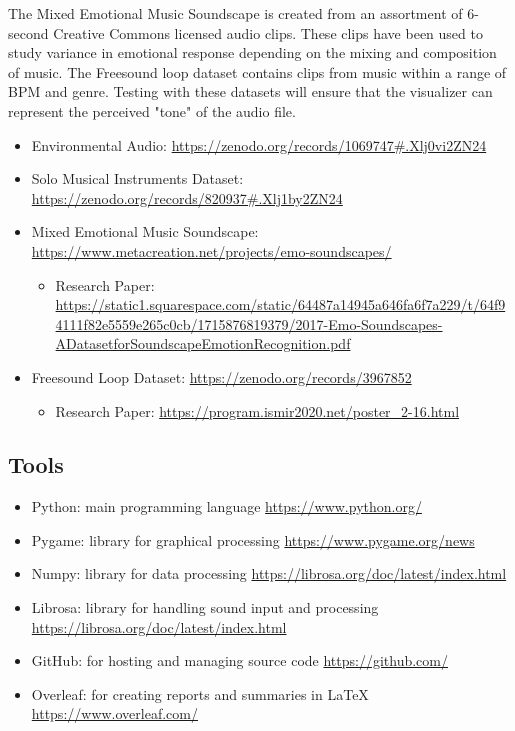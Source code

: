\documentclass{article}
\begin{document}
The Mixed Emotional Music Soundscape is created from an assortment of 6-second Creative Commons licensed audio clips. These clips have been used to study variance in emotional response depending on the mixing and composition of music. The Freesound loop dataset contains clips from music within a range of BPM and genre. Testing with these datasets will ensure that the visualizer can represent the perceived "tone" of the audio file. \newline

\begin{itemize}
    \item Environmental Audio: \url{https://zenodo.org/records/1069747#.Xlj0vi2ZN24}
    \item Solo Musical Instruments Dataset: \url{https://zenodo.org/records/820937#.Xlj1by2ZN24}
    \item Mixed Emotional Music Soundscape: \url{https://www.metacreation.net/projects/emo-soundscapes/}
    \begin{itemize}
        \item Research Paper: \url{https://static1.squarespace.com/static/64487a14945a646fa6f7a229/t/64f94111f82e5559e265c0cb/1715876819379/2017-Emo-Soundscapes-ADatasetforSoundscapeEmotionRecognition.pdf}
    \end{itemize}
    \item Freesound Loop Dataset: \url{https://zenodo.org/records/3967852}
    \begin{itemize}
        \item Research Paper: \url{https://program.ismir2020.net/poster_2-16.html}
    \end{itemize}
\end{itemize}


\subsection{Tools}
\begin{itemize}
    \item Python: main programming language \url{https://www.python.org/}
    \item Pygame: library for graphical processing \url{https://www.pygame.org/news}
    \item Numpy: library for data processing \url{https://librosa.org/doc/latest/index.html}
    \item Librosa: library for handling sound input and processing \url{https://librosa.org/doc/latest/index.html}
    \item GitHub: for hosting and managing source code \url{https://github.com/}
    \item Overleaf: for creating reports and summaries in LaTeX \url{https://www.overleaf.com/}
\end{itemize}
\end{document}
